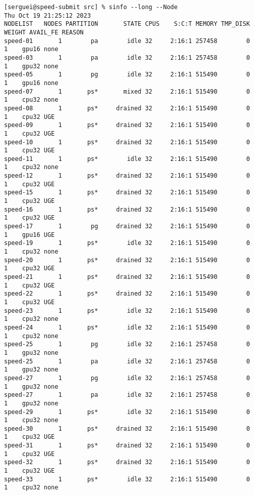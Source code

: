 \small
\begin{verbatim}
[serguei@speed-submit src] % sinfo --long --Node
Thu Oct 19 21:25:12 2023
NODELIST   NODES PARTITION       STATE CPUS    S:C:T MEMORY TMP_DISK WEIGHT AVAIL_FE REASON
speed-01       1        pa        idle 32     2:16:1 257458        0      1    gpu16 none
speed-03       1        pa        idle 32     2:16:1 257458        0      1    gpu32 none
speed-05       1        pg        idle 32     2:16:1 515490        0      1    gpu16 none
speed-07       1       ps*       mixed 32     2:16:1 515490        0      1    cpu32 none
speed-08       1       ps*     drained 32     2:16:1 515490        0      1    cpu32 UGE
speed-09       1       ps*     drained 32     2:16:1 515490        0      1    cpu32 UGE
speed-10       1       ps*     drained 32     2:16:1 515490        0      1    cpu32 UGE
speed-11       1       ps*        idle 32     2:16:1 515490        0      1    cpu32 none
speed-12       1       ps*     drained 32     2:16:1 515490        0      1    cpu32 UGE
speed-15       1       ps*     drained 32     2:16:1 515490        0      1    cpu32 UGE
speed-16       1       ps*     drained 32     2:16:1 515490        0      1    cpu32 UGE
speed-17       1        pg     drained 32     2:16:1 515490        0      1    gpu16 UGE
speed-19       1       ps*        idle 32     2:16:1 515490        0      1    cpu32 none
speed-20       1       ps*     drained 32     2:16:1 515490        0      1    cpu32 UGE
speed-21       1       ps*     drained 32     2:16:1 515490        0      1    cpu32 UGE
speed-22       1       ps*     drained 32     2:16:1 515490        0      1    cpu32 UGE
speed-23       1       ps*        idle 32     2:16:1 515490        0      1    cpu32 none
speed-24       1       ps*        idle 32     2:16:1 515490        0      1    cpu32 none
speed-25       1        pg        idle 32     2:16:1 257458        0      1    gpu32 none
speed-25       1        pa        idle 32     2:16:1 257458        0      1    gpu32 none
speed-27       1        pg        idle 32     2:16:1 257458        0      1    gpu32 none
speed-27       1        pa        idle 32     2:16:1 257458        0      1    gpu32 none
speed-29       1       ps*        idle 32     2:16:1 515490        0      1    cpu32 none
speed-30       1       ps*     drained 32     2:16:1 515490        0      1    cpu32 UGE
speed-31       1       ps*     drained 32     2:16:1 515490        0      1    cpu32 UGE
speed-32       1       ps*     drained 32     2:16:1 515490        0      1    cpu32 UGE
speed-33       1       ps*        idle 32     2:16:1 515490        0      1    cpu32 none

\end{verbatim}
